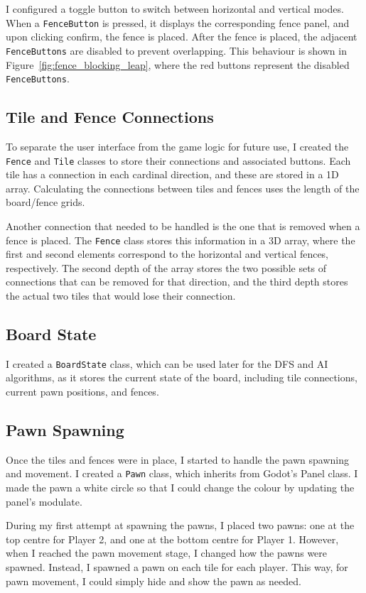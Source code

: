 \documentclass[progress]{cmpreport}
\begin{document}
\noindent I configured a toggle button to switch between horizontal and vertical modes. When a \texttt{FenceButton} is pressed, it displays the corresponding fence panel, and upon clicking confirm, the fence is placed. After the fence is placed, the adjacent \texttt{FenceButtons} are disabled to prevent overlapping. This behaviour is shown in Figure~\ref{fig:fence_blocking_leap}, where the red buttons represent the disabled \texttt{FenceButtons}.  

\subsection{Tile and Fence Connections}
To separate the user interface from the game logic for future use, I created the \texttt{Fence} and \texttt{Tile} classes to store their connections and associated buttons. Each tile has a connection in each cardinal direction, and these are stored in a 1D array. Calculating the connections between tiles and fences uses the length of the board/fence grids.  

Another connection that needed to be handled is the one that is removed when a fence is placed. The \texttt{Fence} class stores this information in a 3D array, where the first and second elements correspond to the horizontal and vertical fences, respectively. The second depth of the array stores the two possible sets of connections that can be removed for that direction, and the third depth stores the actual two tiles that would lose their connection.  

\subsection{Board State}
I created a \texttt{BoardState} class, which can be used later for the DFS and AI algorithms, as it stores the current state of the board, including tile connections, current pawn positions, and fences.

\subsection{Pawn Spawning}
Once the tiles and fences were in place, I started to handle the pawn spawning and movement. I created a \texttt{Pawn} class, which inherits from Godot's Panel class. I made the pawn a white circle so that I could change the colour by updating the panel's modulate.  

\noindent During my first attempt at spawning the pawns, I placed two pawns: one at the top centre for Player 2, and one at the bottom centre for Player 1. However, when I reached the pawn movement stage, I changed how the pawns were spawned. Instead, I spawned a pawn on each tile for each player. This way, for pawn movement, I could simply hide and show the pawn as needed.
\end{document}
